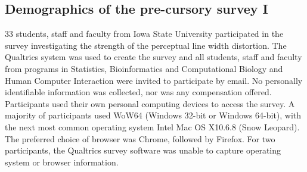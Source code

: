 
%

%
\appendix
\subsection*{Demographics of the pre-cursory survey I}\label{app1}
33 students, staff and faculty from Iowa State University participated in the survey investigating the strength of the perceptual line width distortion. The Qualtrics system \cite{} was used to create the survey and all students, staff and faculty from programs in Statistics, Bioinformatics and Computational Biology and Human Computer Interaction were invited to participate by email. No personally identifiable information was collected, nor was any compensation offered. Participants used their own personal computing devices to access the survey. A majority of participants used WoW64 (Windows 32-bit or Windows 64-bit), with the next most common operating system Intel Mac OS X10.6.8 (Snow Leopard). The preferred choice of browser was  Chrome, followed by Firefox. 
For two participants, the Qualtrics survey software was unable to capture operating system or browser information.
% 

